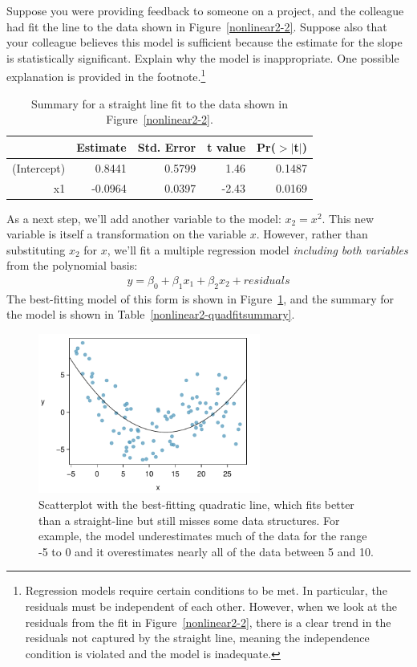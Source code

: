 \begin{exercise}
Suppose you were providing feedback to someone on a project, and the colleague had fit the line to the data shown in Figure~\ref{nonlinear2-2}. Suppose also that your colleague believes this model is sufficient because the estimate for the slope is statistically significant. Explain why the model is inappropriate. One possible explanation is provided in the footnote.\footnote{Regression models require certain conditions to be met. In particular, the residuals must be independent of each other. However, when we look at the residuals from the fit in Figure~\ref{nonlinear2-2}, there is a clear trend in the residuals not captured by the straight line, meaning the independence condition is violated and the model is inadequate.}
\end{exercise}

\begin{table}
\centering
\begin{tabular}{rrrrr}
  \hline
 & Estimate & Std. Error & t value & Pr($>$$|$t$|$) \\ 
  \hline
(Intercept) & 0.8441 & 0.5799 & 1.46 & 0.1487 \\ 
  x1  & -0.0964 & 0.0397 & -2.43 & 0.0169 \\ 
   \hline
\end{tabular}
\caption{Summary for a straight line fit to the data shown in Figure~\ref{nonlinear2-2}.}
\label{nonlinear2-linearfitsummary}
\end{table}

As a next step, we'll add another variable to the model: $x_2=x^2$. This new variable is itself a transformation on the variable $x$. However, rather than substituting $x_2$ for $x$, we'll fit a multiple regression model \emph{including both variables} from the polynomial basis:
\begin{align*}
y = \beta_0 + \beta_1x_1 + \beta_2x_2 + residuals
\end{align*}
The best-fitting model of this form is shown in Figure~\ref{nonlinear2-3}, and the summary for the model is shown in Table~\ref{nonlinear2-quadfitsummary}.

\begin{figure}
\centering
\includegraphics[width=0.65\textwidth]{RegressionExtras/figures/nonlinear/nonlinear2-3}
\caption{Scatterplot with the best-fitting quadratic line, which fits better than a straight-line but still misses some data structures. For example, the model underestimates much of the data for the range -5 to 0 and it overestimates nearly all of the data between 5 and 10.}
\label{nonlinear2-3}
\end{figure}

